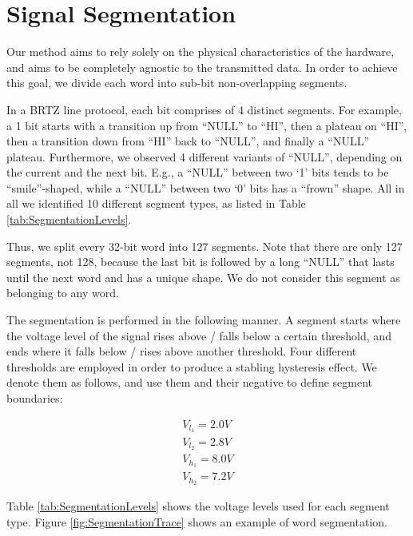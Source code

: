 \documentclass[conference]{IEEEtran}
\begin{document}


\section{Signal Segmentation} \label{SignalSegmentation}
  Our method aims to rely solely on the physical characteristics of the hardware, and aims to be completely agnostic to the transmitted data. In order to achieve this goal, we divide each word into sub-bit non-overlapping segments.
  
  In a BRTZ line protocol, each bit comprises of 4 distinct segments. For example, a 1 bit starts with a transition up from ``NULL'' to ``HI'', then a plateau on ``HI'', then a transition down from ``HI'' back to ``NULL'', and finally a ``NULL'' plateau. Furthermore, we observed 4 different variants of ``NULL'', depending on the current and the next bit. E.g., a ``NULL'' between two `1' bits tends to be ``smile''-shaped, while a ``NULL'' between two `0' bits has a ``frown'' shape. All in all we identified 10 different segment types, as listed in Table \ref{tab:SegmentationLevels}.
  
  Thus, we split every 32-bit word into 127 segments. Note that there are only 127 segments, not 128, because the last bit is followed by a long ``NULL'' that lasts until the next word and has a unique shape. We do not consider this segment as belonging to any word.
  
  The segmentation is performed in the following manner. A segment starts where the voltage level of the signal rises above / falls below a certain threshold, and ends where it falls below / rises above another threshold. Four different thresholds are employed in order to produce a stabling hysteresis effect. We denote them as follows, and use them and their negative to define segment boundaries:
  
  \begin{align*}
    V_{l_1} = 2.0V \\
    V_{l_2} = 2.8V \\
    V_{h_1} = 8.0V \\
    V_{h_2} = 7.2V 
  \end{align*}
  
  Table \ref{tab:SegmentationLevels} shows the voltage levels used for each segment type. Figure \ref{fig:SegmentationTrace} shows an example of word segmentation.
  
\end{document}
